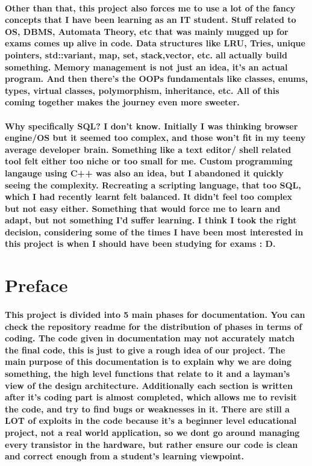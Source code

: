 \documentclass{article}
\begin{document}
\paragraph{
Other than that, this project also forces me to use a lot of the fancy concepts that I have been learning as an IT student.
Stuff related to OS, DBMS, Automata Theory, etc that was mainly mugged up for exams comes up alive in code.
Data structures like LRU, Tries, unique pointers, std::variant, map, set, stack,vector,  etc. all actually build something.
Memory management is not just an idea, it's an actual program.
And then there's the OOPs fundamentals like classes, enums, types, virtual classes, polymorphism, inheritance, etc.
All of this coming together makes the journey even more sweeter.
}
\paragraph{
    Why specifically SQL? I don't know. Initially I was thinking browser engine/OS but it seemed too complex, and those won't fit in my teeny average developer brain.
    Something like a text editor/ shell related tool felt either too niche or too small for me.
    Custom programming langauge using C++ was also an idea, but I abandoned it quickly seeing the complexity.
    Recreating a scripting language, that too SQL, which I had recently learnt felt balanced.
    It didn't feel too complex but not easy either. Something that would force me to learn and adapt, but not something I'd suffer learning.
    I think I took the right decision, considering some of the times I have been most interested in this project is when I should have been studying for exams : D.
}
\newpage
\section{Preface}

\paragraph{
    This project is divided into 5 main phases for documentation. You can check the repository readme for the distribution of phases in terms of coding.
    The code given in documentation may not accurately match the final code, this is just to give a rough idea of our project.
    The main purpose of this documentation is to explain why we are doing something, the high level functions that relate to it and a layman's view of the design architecture.
    Additionally each section is written after it's coding part is almost completed, which allows me to revisit the code, and try to find bugs or weaknesses in it.
    There are still a LOT of exploits in the code because it's a beginner level educational project, not a real world application,
    so we dont go around managing every transistor in the hardware, but rather ensure our code is clean and correct enough from a student's learning viewpoint.
}
\end{document}
